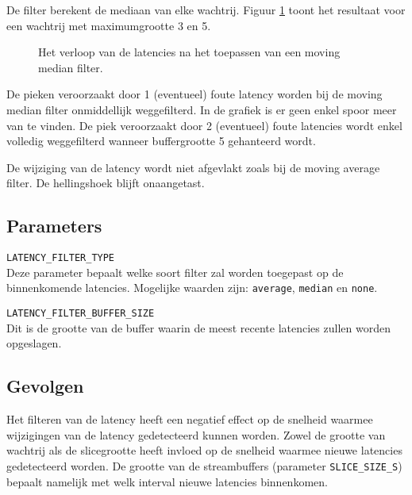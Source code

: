 De filter berekent de mediaan van elke wachtrij. Figuur \ref{median-graphs} toont het resultaat voor een wachtrij met maximumgrootte 3 en 5.

\begin{figure}[!tbph]
	\centering
	\hfill
	\captionsetup{width=0.7\textwidth}
	\caption{Het verloop van de latencies na het toepassen van een moving median filter.}
	\label{median-graphs}
\end{figure}

De pieken veroorzaakt door 1 (eventueel) foute latency worden bij de moving median filter onmiddellijk weggefilterd. In de grafiek is er geen enkel spoor meer van te vinden. De piek veroorzaakt door 2 (eventueel) foute latencies wordt enkel volledig weggefilterd wanneer buffergrootte 5 gehanteerd wordt.

De wijziging van de latency wordt niet afgevlakt zoals bij de moving average filter. De hellingshoek blijft onaangetast.

\subsection{Parameters}

\begin{description}
	\item\texttt{LATENCY\_FILTER\_TYPE} \hfill \\
	Deze parameter bepaalt welke soort filter zal worden toegepast op de binnenkomende latencies. Mogelijke waarden zijn: \texttt{average}, \texttt{median} en \texttt{none}.
	
	\item\texttt{LATENCY\_FILTER\_BUFFER\_SIZE} \hfill \\
	Dit is de grootte van de buffer waarin de meest recente latencies zullen worden opgeslagen.

\end{description}

\subsection{Gevolgen}
\label{filter-gevolgen}

Het filteren van de latency heeft een negatief effect op de snelheid waarmee wijzigingen van de latency gedetecteerd kunnen worden. Zowel de grootte van wachtrij als de slicegrootte heeft invloed op de snelheid waarmee nieuwe latencies gedetecteerd worden. De grootte van de streambuffers (parameter \texttt{SLICE\_SIZE\_S}) bepaalt namelijk met welk interval nieuwe latencies binnenkomen. 

